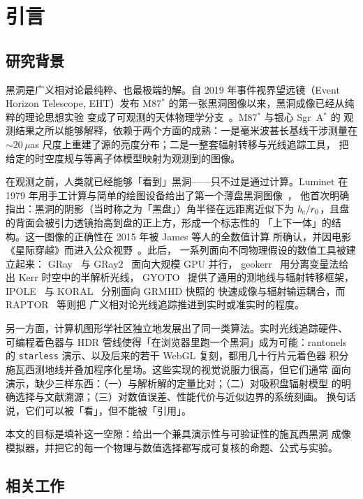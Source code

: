 \section{引言}\label{sec:intro}

\subsection{研究背景}

黑洞是广义相对论最纯粹、也最极端的解。自 2019 年事件视界望远镜（Event Horizon
Telescope, EHT）发布 M87$^\ast$ 的第一张黑洞图像以来，黑洞成像已经从纯粹的理论思想实验
变成了可观测的天体物理学分支~\cite{eht2019,eht2022}。M87$^\ast$ 与银心 Sgr~A$^\ast$ 的
观测结果之所以能够解释，依赖于两个方面的成熟：一是毫米波甚长基线干涉测量在
$\sim 20\,\mu$as 尺度上重建了源的亮度分布；二是一整套辐射转移与光线追踪工具，
把给定的时空度规与等离子体模型映射为观测到的图像。

在观测之前，人类就已经能够「看到」黑洞——只不过是通过计算。Luminet 在
1979 年用手工计算与简单的绘图设备给出了第一个薄盘黑洞图像~\cite{luminet1979}，
他首次明确指出：黑洞的阴影（当时称之为「黑盘」）角半径在远距离近似下为
$b_{c}/r_{0}$，且盘的背面会被引力透镜抬高到盘的正上方，形成一个标志性的
「上下一体」的结构。这一图像的正确性在 2015 年被 James 等人的全数值计算
所确认，并因电影《星际穿越》而进入公众视野~\cite{james2015}。此后，
一系列面向不同物理假设的数值工具被建立起来：
GRay~\cite{gray2013} 与 GRay2~\cite{gray2} 面向大规模 GPU 并行，
geokerr~\cite{dexter2009} 用分离变量法给出 Kerr 时空中的半解析光线，
GYOTO~\cite{gyoto2011} 提供了通用的测地线与辐射转移框架，
IPOLE~\cite{ipole2016} 与 KORAL~\cite{koral2013} 分别面向 GRMHD 快照的
快速成像与辐射输运耦合，而 RAPTOR~\cite{raptor2019} 等则把
广义相对论光线追踪推进到实时或准实时的程度。

另一方面，计算机图形学社区独立地发展出了同一类算法。实时光线追踪硬件、
可编程着色器与 HDR 管线使得「在浏览器里跑一个黑洞」成为可能：rantonels 的
\texttt{starless} 演示、以及后来的若干 WebGL 复刻，都用几十行片元着色器
积分施瓦西测地线并叠加程序化星场。这些实现的视觉说服力很高，但它们通常
面向演示，缺少三样东西：（一）与解析解的定量比对；（二）对吸积盘辐射模型
的明确选择与文献溯源；（三）对数值误差、性能代价与近似边界的系统刻画。
换句话说，它们可以被「看」，但不能被「引用」。

本文的目标是填补这一空隙：给出一个兼具演示性与可验证性的施瓦西黑洞
成像模拟器，并把它的每一个物理与数值选择都写成可复核的命题、公式与实验。

\subsection{相关工作}\label{sec:related}

